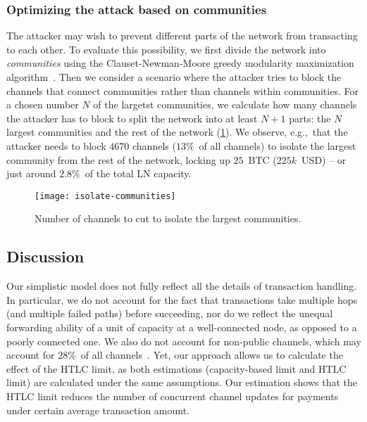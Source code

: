 \subsubsection*{Optimizing the attack based on communities}
The attacker may wish to prevent different parts of the network from transacting to each other.
To evaluate this possibility, we first divide the network into \textit{communities} using the Clauset-Newman-Moore greedy modularity maximization algorithm~\cite{Clauset2004}.
Then we consider a scenario where the attacker tries to block the channels that connect communities 
rather than channels within communities.
For a chosen number $N$ of the largetst communities, we calculate how many channels the attacker has to block to split the network into at least $N+1$ parts: the $N$ largest communities and the rest of the network (\cref{fig:isolate-communities}).
We observe, e.g.,~that the attacker needs to block $4670$ channels 
($13\%$~of all channels) to isolate the largest community from the rest of the network, locking up $25$~BTC ($225k$~USD) -- or just around $2.8\%$~of the total LN capacity.

\begin{figure}[tb]
	\centering
	\texttt{[image: isolate-communities]}
	\caption{Number of channels to cut to isolate the largest communities.\label{fig:isolate-communities}}
\end{figure}



\subsection{Discussion}
Our simplistic model does not fully reflect all the details of transaction handling. 
In particular, we do not account for the fact that transactions take multiple hops (and multiple failed paths) before succeeding, nor do we reflect the unequal forwarding ability of a unit of capacity at a well-connected node, 
as opposed to a poorly connected one.
We also do not account for non-public channels, which may account for $28\%$~of all channels~\cite{BitMEXPrivateChannels}.
Yet, our approach allows us to calculate the effect of the HTLC limit,
as both estimations (capacity-based limit and HTLC limit) are calculated under the same assumptions.
Our estimation shows that the HTLC limit reduces the number of concurrent channel updates 
for payments under certain average transaction amount. 

